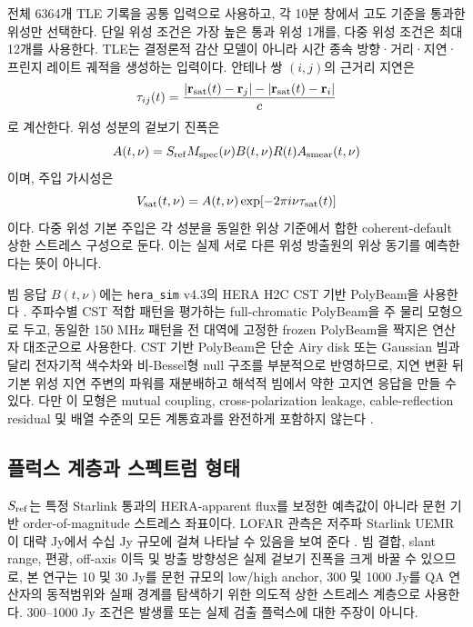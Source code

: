 \documentclass[final,5p,times]{elsarticle}
\newcommand{\NTLERecords}{6364}
\begin{document}
전체 \NTLERecords{}개 TLE 기록을 공통 입력으로 사용하고, 각 10분
창에서 고도 기준을 통과한 위성만 선택한다. 단일 위성 조건은 가장
높은 통과 위성 1개를, 다중 위성 조건은 최대 12개를 사용한다. TLE는
결정론적 감산 모델이 아니라 시간 종속 방향·거리·지연·프린지 레이트
궤적을 생성하는 입력이다. 안테나 쌍 $(i,j)$의 근거리 지연은
\begin{equation}
 \tau_{ij}(t)=
 \frac{|\mathbf r_{\rm sat}(t)-\mathbf r_j|-|\mathbf r_{\rm sat}(t)-\mathbf r_i|}{c}
\end{equation}
로 계산한다. 위성 성분의 겉보기 진폭은
\begin{equation}
 A(t,\nu)=S_{\rm ref}M_{\rm spec}(\nu)B(t,\nu)R(t)A_{\rm smear}(t,\nu)
\end{equation}
이며, 주입 가시성은
\begin{equation}
 V_{\rm sat}(t,\nu)=A(t,\nu)\exp[-2\pi i\nu\tau_{\rm sat}(t)]
\end{equation}
이다. 다중 위성 기본 주입은 각 성분을 동일한 위상 기준에서 합한
coherent-default 상한 스트레스 구성으로 둔다. 이는 실제 서로 다른
위성 방출원의 위상 동기를 예측한다는 뜻이 아니다.

빔 응답 $B(t,\nu)$에는 \texttt{hera\_sim} v4.3의 HERA H2C CST
기반 PolyBeam을 사용한다
\citep{fagnoni2021,wilensky2024beam}. 주파수별 CST 적합 패턴을
평가하는 full-chromatic PolyBeam을 주 물리 모형으로 두고, 동일한
150 MHz 패턴을 전 대역에 고정한 frozen PolyBeam을 짝지은 연산자
대조군으로 사용한다. CST 기반 PolyBeam은 단순 Airy disk 또는
Gaussian 빔과 달리 전자기적 색수차와 비-Bessel형 null 구조를
부분적으로 반영하므로, 지연 변환 뒤 기본 위성 지연 주변의 파워를
재분배하고 해석적 빔에서 약한 고지연 응답을 만들 수 있다. 다만 이
모형은 mutual coupling, cross-polarization leakage, cable-reflection
residual 및 배열 수준의 모든 계통효과를 완전하게 포함하지 않는다
\citep{barry2016,ewallwice2017,dillon2020redcal,kim2023beamvar}.

\subsection{플럭스 계층과 스펙트럼 형태}
\label{sec:flux}

$S_{\rm ref}$는 특정 Starlink 통과의 HERA-apparent flux를 보정한
예측값이 아니라 문헌 기반 order-of-magnitude 스트레스 좌표이다.
LOFAR 관측은 저주파 Starlink UEMR이 대략 Jy에서 수십 Jy 규모에
걸쳐 나타날 수 있음을 보여 준다
\citep{divruno2023,bassa2024}. 빔 결합, slant range, 편광,
off-axis 이득 및 방출 방향성은 실제 겉보기 진폭을 크게 바꿀 수
있으므로, 본 연구는 10 및 30 Jy를 문헌 규모의 low/high anchor,
300 및 1000 Jy를 QA 연산자의 동적범위와 실패 경계를 탐색하기 위한
의도적 상한 스트레스 계층으로 사용한다. 300--1000 Jy 조건은 발생률
또는 실제 검출 플럭스에 대한 주장이 아니다.
\end{document}
